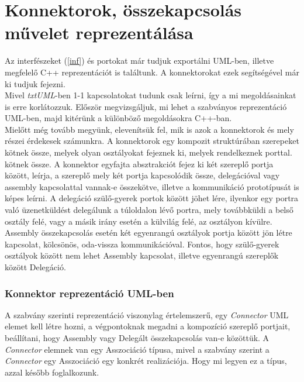 \documentclass[a4paper,12pt]{report}
\begin{document}
\section{Konnektorok, összekapcsolás művelet reprezentálása} \label{connect}
Az interfészeket (\ref{inf}) és portokat már tudjuk exportálni UML-ben, illetve megfelelő C++ reprezentációt is találtunk. A konnektorokat ezek segítségével már ki tudjuk fejezni. \\
Mivel \textit{txtUML}-ben 1-1 kapcsolatokat tudunk csak leírni, így a mi megoldásainkat is erre korlátozzuk. Először megvizsgáljuk, mi lehet a szabványos reprezentáció UML-ben, majd kitérünk a különböző megoldásokra C++-ban. \\
Mielőtt még tovább megyünk, elevenítsük fel, mik is azok a konnektorok és mely részei érdekesek számunkra. A konnektorok egy kompozit struktúrában szerepeket kötnek össze, melyek olyan osztályokat fejeznek ki, melyek rendelkeznek porttal. kötnek össze. A konnektor egyfajta absztrakciót fejez ki két szereplő portja között, leírja, a szereplő mely két portja kapcsolódik össze, delegációval vagy assembly kapcsolattal vannak-e összekötve, illetve a kommunikáció prototípusát is képes leírni. A delegáció szülő-gyerek portok között jöhet lére, ilyenkor egy portra való üzenetküldést delegálunk a túloldalon lévő portra, mely továbbküldi a belső osztály felé, vagy a másik irány esetén a külvilág felé, az osztályon kívülre. Assembly összekapcsolás esetén két egyenrangú osztályok portja között jön létre kapcsolat, kölcsönös, oda-vissza kommunikációval. Fontos, hogy szülő-gyerek osztályok között nem lehet Assembly kapcsolat, illetve egyenrangú szereplők között Delegáció.
\subsubsection{Konnektor reprezentáció UML-ben}
A szabvány szerinti reprezentáció viszonylag értelemszerű, egy \textit{Connector} UML elemet kell létre hozni, a végpontoknak megadni a kompozíció szereplő portjait, beállítani, hogy Assembly vagy Delegált összekapcsolás van-e közöttük. A \textit{Connector} elemnek van egy Asszociáció típusa, mivel a szabvány szerint a \textit{Connector} egy Asszociáció egy konkrét realizációja. Hogy mi legyen ez a típus, azzal később foglalkozunk.
\end{document}
